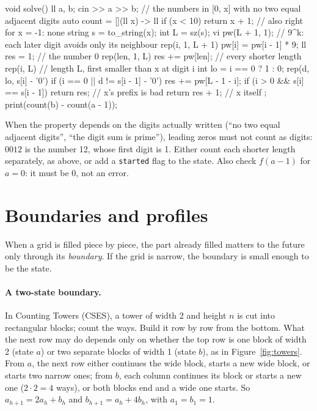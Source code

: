 \begin{code}
void solve() {
    ll a, b;
    cin >> a >> b;
    // the numbers in [0, x] with no two equal adjacent digits
    auto count = [](ll x) -> ll {
        if (x < 10) return x + 1;  // also right for x = -1: none
        string s = to_string(x);
        int L = sz(s);
        vi pw(L + 1, 1);  // 9^k: each later digit avoids only its neighbour
        rep(i, 1, L + 1) pw[i] = pw[i - 1] * 9;
        ll res = 1;  // the number 0
        rep(len, 1, L) res += pw[len];  // every shorter length
        rep(i, L) {  // length L, first smaller than x at digit i
            int lo = i == 0 ? 1 : 0;
            rep(d, lo, s[i] - '0')
                if (i == 0 || d != s[i - 1] - '0') res += pw[L - 1 - i];
            if (i > 0 && s[i] == s[i - 1]) return res;  // x's prefix is bad
        }
        return res + 1;  // x itself
    };
    print(count(b) - count(a - 1));
}
\end{code}


\begin{pitfall}
When the property depends on the digits actually written (``no two equal adjacent digits'', ``the digit sum is prime''), leading
zeros must not count as digits: $0012$ is the number 12, whose first digit is 1. Either count each shorter length separately, as
above, or add a \texttt{started} flag to the state. Also check $f(a - 1)$ for $a = 0$: it must be 0, not an error.
\end{pitfall}

\section[Boundaries and profiles]{Boundaries and profiles \hfill \plat}\label{sec:profiledp}

When a grid is filled piece by piece, the part already filled matters to the future only through its \emph{boundary}. If the grid is
narrow, the boundary is small enough to be the state.

\paragraph{A two-state boundary.} In Counting Towers (CSES), a tower of width 2 and height $n$ is cut into rectangular blocks; count
the ways. Build it row by row from the bottom. What the next row may do depends only on whether the top row is one block of width 2
(state $a$) or two separate blocks of width 1 (state $b$), as in Figure~\ref{fig:towers}. From $a$, the next row either continues
the wide block, starts a new wide block, or starts two narrow ones; from $b$, each column continues its block or starts a new one
($2 \cdot 2 = 4$ ways), or both blocks end and a wide one starts. So $a_{h+1} = 2a_h + b_h$ and $b_{h+1} = a_h + 4b_h$, with
$a_1 = b_1 = 1$.

